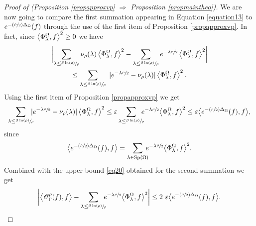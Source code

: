 \documentclass[JEP,XML,SOM,Unicode,NoFloatCountersInSection,published]{cedram}
\let\mathcal\mathscr
\let\epsilon\varepsilon
\newcommand{\Psfrac}[2]{(\sfrac{#1}{#2})}
\theoremstyle{plain}
\theoremstyle{definition}
\newcommand{\somme}[1]{\sum_{#1}}
\begin{document}
\begin{proof}[Proof of (Proposition \ref{propapproxvp}
$\Rightarrow$ Proposition \ref{propmaintheo})]
We are now going to compare the first summation appearing in Equation \eqref{equation13} to $e^{- \Psfrac{\rho }{2} \Delta_{\Omega}}(f)$ through the use of the first item of Proposition \ref{propapproxvp}. In fact, since $\left<\Phi^{\Omega}_{\lambda},f \right>^2 \ge\nobreak 0$ we have
\begin{multline*}
\biggl| \somme{ \lambda \le \sfrac{\beta \ln (\rho)} {\rho}} \nu_{\rho}(\lambda) \left<\Phi^{\Omega}_{\lambda},f \right>^2 - \somme{ \lambda \le \sfrac{\beta \ln (\rho)} {\rho}} e^{-\lambda \sfrac{\rho}{2}} \left<\Phi^{\Omega}_{\lambda},f \right>^2 \biggr| \\
\le \somme{ \lambda \le \sfrac{\beta \ln (\rho)} {\rho}} \ | e^{-\lambda \sfrac{\rho}{2}} - \nu_{\rho}(\lambda) | \left<\Phi^{\Omega}_{\lambda},f \right>^2.
\end{multline*}
Using the first item of Proposition \ref{propapproxvp} we get
\[
\somme{ \lambda \le \sfrac{\beta \ln (\rho)} {\rho}}\hspace*{-2mm} | e^{-\lambda \sfrac{\rho}{2}} - \nu_{\rho}(\lambda) | \left<\Phi^{\Omega}_{\lambda},f \right>^2 \le \epsilon \somme{ \lambda \le \sfrac{\beta \ln (\rho)} {\rho}}\hspace*{-2mm} e^{-\lambda \sfrac{\rho}{2}} \bigl<\Phi^{\Omega}_{\lambda},f \bigr>^2  \le \epsilon \bigl< e^{- \Psfrac{\rho}{2} \Delta_{\Omega}}(f), f \bigr>,
\]
since
\begin{equation}
\label{eqdemmaintheo3000}
\bigl< e^{- \Psfrac{\rho}{2} \Delta_{\Omega}}(f), f \bigr> = \somme{ \lambda \in \mathrm{Sp}(\Omega)}\hspace*{-2mm} e^{-\lambda \sfrac{\rho}{2}} \bigl<\Phi^{\Omega}_{\lambda},f \bigr>^2.
\end{equation}
Combined with the upper bound \eqref{eq20} obtained for the second summation we get
\begin{equation}
\label{equation23}
\biggl| \bigl< \mathcal{O}_{\Gamma}^{\rho}(f),f \bigr> - \somme{ \lambda \le \sfrac{\beta \ln (\rho)} {\rho}}\hspace*{-2mm} e^{-\lambda \sfrac{\rho}{2}} \bigl<\Phi^{\Omega}_{\lambda},f \bigr>^2 \biggr| \le 2 \ \epsilon \bigl< e^{- \Psfrac{\rho}{2} \Delta_{\Omega}}(f), f \bigr>.
\end{equation}


\end{proof}
\end{document}
